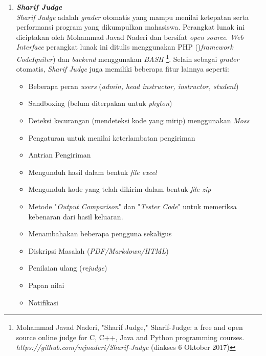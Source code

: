 \documentclass[a4paper,twoside]{article}
\begin{document}
\begin{enumerate}
\begin{enumerate}
			\item \textbf{\textit{Sharif Judge} }\\
			\textit{Sharif Judge} adalah \textit{grader} otomatis yang mampu menilai ketepatan serta performansi program yang dikumpulkan mahasiswa. Perangkat lunak ini diciptakan oleh Mohammad Javad Naderi dan bersifat \textit{open source}. \textit{Web Interface} perangkat lunak ini ditulis menggunakan PHP ()\textit{framework CodeIgniter}) dan \textit{backend} menggunakan \textit{BASH} \footnote{Mohammad Javad Naderi, "Sharif Judge," Sharif-Judge: a free and open source online judge for C, C++, Java and Python programming courses. \textit{https://github.com/mjnaderi/Sharif-Judge} (diakses 6 Oktober 2017)}.
			Selain sebagai \textit{grader} otomatis, \textit{Sharif Judge} juga memiliki beberapa fitur lainnya seperti:
			\begin{itemize}
				\item Beberapa peran \textit{users} (\textit{admin, head instructor, instructor, student})
				\item Sandboxing (belum diterpakan untuk \textit{phyton})
				\item Deteksi kecurangan (mendeteksi kode yang mirip) menggunakan \textit{Moss}
				\item Pengaturan untuk menilai keterlambatan pengiriman
				\item Antrian Pengiriman
				\item Mengunduh hasil dalam bentuk \textit{file excel}
				\item Mengunduh kode yang telah dikirim dalam bentuk \textit{file zip}
				\item Metode "\textit{Output Comparison}" dan "\textit{Tester Code}" untuk memeriksa kebenaran dari hasil keluaran.
				\item Menambahakan beberapa pengguna sekaligus
				\item Diskripsi Masalah (\textit{PDF/Markdown/HTML})
				\item Penilaian ulang (\textit{rejudge})
				\item Papan nilai
				\item Notifikasi
			\end{itemize}
			

\end{enumerate}
\end{enumerate}
\end{document}
